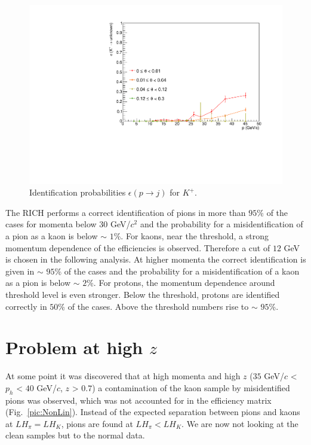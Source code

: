 \begin{figure}[!p]
  \includegraphics[scale=0.35]{./gfx/Kp_u.pdf}
	\caption{Identification probabilities $\epsilon(p \rightarrow j)$ for $K^+$.}
	\label{pic:Effkp}
\end{figure}

The RICH performs a correct identification of pions in more than $95$\% of the cases for momenta below 30 GeV/$c^2$ and the probability for a misidentification of a pion as a kaon is below $\sim$ $1$\%. For kaons, near the threshold, a strong momentum dependence of the efficiencies is observed. Therefore a cut of $12$ GeV is chosen in the following analysis. At higher momenta the correct identification is given in $\sim$ $95$\% of the cases and the probability for a misidentification of a kaon as a pion is below $\sim$ $2$\%. For protons, the momentum dependence around threshold level is even stronger. Below the threshold, protons are identified correctly in $50$\% of the cases. Above the threshold numbers rise to $\sim$ $95$\%.

\section{Problem at high $z$}

At some point it was discovered that at high momenta and high $z$ ($35$ GeV/$c$ < $p_h$ < $40$ GeV/$c$, $z$ > $0.7$) a contamination of the kaon sample by misidentified pions was observed, which was not accounted for in the efficiency matrix (Fig.~\ref{pic:NonLin}). Instead of the expected separation between pions and kaons at $LH_{\pi} = LH_K$, pions are found at $LH_{\pi} < LH_K$. We are now not looking at the clean samples but to the normal data.

